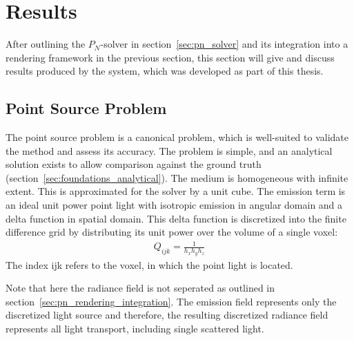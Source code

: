 \section{Results}
\label{sec:pn_results}

After outlining the $P_N$-solver in section~\ref{sec:pn_solver} and its integration into a rendering framework in the previous section, this section will give and discuss results produced by the system, which was developed as part of this thesis.

\subsection{Point Source Problem}
\label{sec:pn_results_pointsource}

The point source problem is a canonical problem, which is well-suited to validate the method and assess its accuracy. The problem is simple, and an analytical solution exists to allow comparison against the ground truth (section~\ref{sec:foundations_analytical}). The medium is homogeneous with infinite extent. This is approximated for the solver by a unit cube. The emission term is an ideal unit power point light with isotropic emission in angular domain and a delta function in spatial domain. This delta function is discretized into the finite difference grid by distributing its unit power over the volume of a single voxel:
\begin{align}
Q_{ijk} = \frac{1}{h_xh_yh_z}
\end{align}
The index {ijk} refers to the voxel, in which the point light is located.

Note that here the radiance field is not seperated as outlined in section~\ref{sec:pn_rendering_integration}. The emission field represents only the discretized light source and therefore, the resulting discretized radiance field represents all light transport, including single scattered light.

